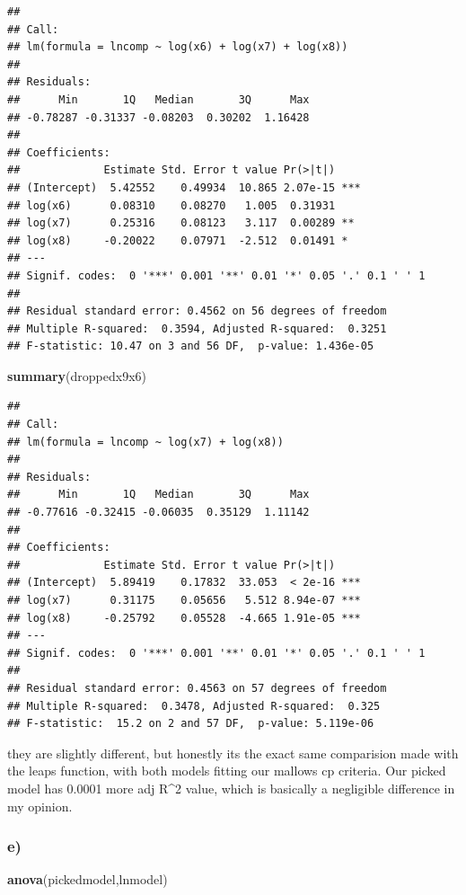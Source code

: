 \documentclass[
]{article}
\newenvironment{Shaded}{\begin{snugshade}}{\end{snugshade}}
\newcommand{\FunctionTok}[1]{\textcolor[rgb]{0.13,0.29,0.53}{\textbf{#1}}}
\newcommand{\NormalTok}[1]{#1}
\begin{document}
\begin{verbatim}
## 
## Call:
## lm(formula = lncomp ~ log(x6) + log(x7) + log(x8))
## 
## Residuals:
##      Min       1Q   Median       3Q      Max 
## -0.78287 -0.31337 -0.08203  0.30202  1.16428 
## 
## Coefficients:
##             Estimate Std. Error t value Pr(>|t|)    
## (Intercept)  5.42552    0.49934  10.865 2.07e-15 ***
## log(x6)      0.08310    0.08270   1.005  0.31931    
## log(x7)      0.25316    0.08123   3.117  0.00289 ** 
## log(x8)     -0.20022    0.07971  -2.512  0.01491 *  
## ---
## Signif. codes:  0 '***' 0.001 '**' 0.01 '*' 0.05 '.' 0.1 ' ' 1
## 
## Residual standard error: 0.4562 on 56 degrees of freedom
## Multiple R-squared:  0.3594, Adjusted R-squared:  0.3251 
## F-statistic: 10.47 on 3 and 56 DF,  p-value: 1.436e-05
\end{verbatim}

\begin{Shaded}
\begin{Highlighting}[]
\FunctionTok{summary}\NormalTok{(droppedx9x6)}
\end{Highlighting}
\end{Shaded}

\begin{verbatim}
## 
## Call:
## lm(formula = lncomp ~ log(x7) + log(x8))
## 
## Residuals:
##      Min       1Q   Median       3Q      Max 
## -0.77616 -0.32415 -0.06035  0.35129  1.11142 
## 
## Coefficients:
##             Estimate Std. Error t value Pr(>|t|)    
## (Intercept)  5.89419    0.17832  33.053  < 2e-16 ***
## log(x7)      0.31175    0.05656   5.512 8.94e-07 ***
## log(x8)     -0.25792    0.05528  -4.665 1.91e-05 ***
## ---
## Signif. codes:  0 '***' 0.001 '**' 0.01 '*' 0.05 '.' 0.1 ' ' 1
## 
## Residual standard error: 0.4563 on 57 degrees of freedom
## Multiple R-squared:  0.3478, Adjusted R-squared:  0.325 
## F-statistic:  15.2 on 2 and 57 DF,  p-value: 5.119e-06
\end{verbatim}

they are slightly different, but honestly its the exact same comparision
made with the leaps function, with both models fitting our mallows cp
criteria. Our picked model has 0.0001 more adj R\^{}2 value, which is
basically a negligible difference in my opinion.

\subsubsection{e)}\label{e}

\begin{Shaded}
\begin{Highlighting}[]
\FunctionTok{anova}\NormalTok{(pickedmodel,lnmodel)}
\end{Highlighting}
\end{Shaded}
\end{document}
